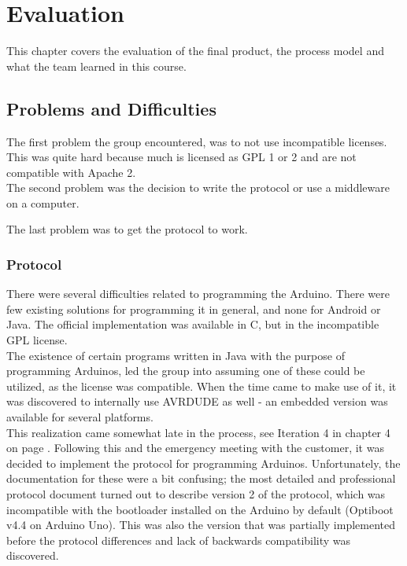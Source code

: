 \chapter{Evaluation}

This chapter covers the evaluation of the final product, the process model and what the team learned in this course.

\section{Problems and Difficulties}
	The first problem the group encountered, was to not use incompatible licenses. This was quite hard because much is licensed as GPL 1 or 2 and are not compatible with Apache 2. \\

	The second problem was the decision to write the protocol or use a middleware on a computer.

	The last problem was to get the protocol to work.

\subsection{Protocol}
There were several difficulties related to programming the Arduino. There were few existing solutions for programming it in general, and none for Android or Java. The official implementation was available in C, but in the incompatible GPL license.\\

The existence of certain programs written in Java with the purpose of programming Arduinos,
led the group into assuming one of these could be utilized, as the license was compatible. When the time came to make use of it, it was discovered to internally use AVRDUDE as well - an embedded version was available for several platforms.\\

This realization came somewhat late in the process, see Iteration 4 in chapter 4 on page \pageref{Iteration4}. Following this and the emergency meeting with the customer, it was decided to implement the protocol for programming Arduinos. Unfortunately, the documentation for these were a bit confusing; the most detailed and professional protocol document turned out to describe version 2 of the protocol\cite{AVR068}, which was incompatible with the bootloader installed on the Arduino by default (Optiboot v4.4 on Arduino Uno). This was also the version that was partially implemented before the protocol differences and lack of backwards compatibility was discovered.\\

